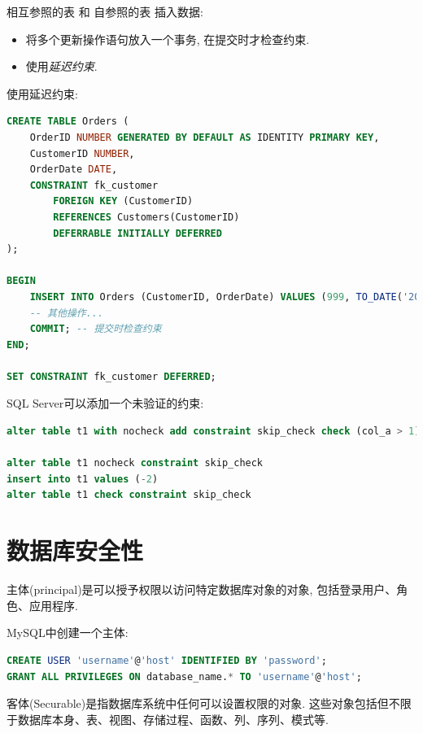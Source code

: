 相互参照的表 和 自参照的表 插入数据:
\begin{itemize}
    \item 将多个更新操作语句放入一个事务, 在提交时才检查约束.
    \item 使用\textit{延迟约束}.
\end{itemize}

使用延迟约束:
\begin{lstlisting}[language=SQL]
CREATE TABLE Orders (
    OrderID NUMBER GENERATED BY DEFAULT AS IDENTITY PRIMARY KEY,
    CustomerID NUMBER,
    OrderDate DATE,
    CONSTRAINT fk_customer
        FOREIGN KEY (CustomerID)
        REFERENCES Customers(CustomerID)
        DEFERRABLE INITIALLY DEFERRED
);

BEGIN
    INSERT INTO Orders (CustomerID, OrderDate) VALUES (999, TO_DATE('2023-01-01', 'YYYY-MM-DD'));
    -- 其他操作...
    COMMIT; -- 提交时检查约束
END;

SET CONSTRAINT fk_customer DEFERRED;
\end{lstlisting}

SQL Server可以添加一个未验证的约束:
\begin{lstlisting}[language=SQL]
alter table t1 with nocheck add constraint skip_check check (col_a > 1)

alter table t1 nocheck constraint skip_check
insert into t1 values (-2)
alter table t1 check constraint skip_check
\end{lstlisting}

\section{数据库安全性}


\begin{definition}[主体(Principal)]
    主体(principal)是可以授予权限以访问特定数据库对象的对象, 包括登录用户、角色、应用程序.
\end{definition}

MySQL中创建一个主体:
\begin{lstlisting}[language=SQL]
CREATE USER 'username'@'host' IDENTIFIED BY 'password';
GRANT ALL PRIVILEGES ON database_name.* TO 'username'@'host';
\end{lstlisting}

\begin{definition}[客体(Securable)]
    客体(Securable)是指数据库系统中任何可以设置权限的对象. 
    这些对象包括但不限于数据库本身、表、视图、存储过程、函数、列、序列、模式等.
\end{definition}

